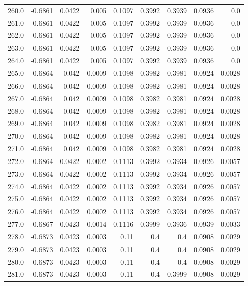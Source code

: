 \begin{longtable}{lrrrrrrrr}
260.0 & -0.6861 & 0.0422 & 0.005 & 0.1097 & 0.3992 & 0.3939 & 0.0936 & 0.0 \\
261.0 & -0.6861 & 0.0422 & 0.005 & 0.1097 & 0.3992 & 0.3939 & 0.0936 & 0.0 \\
262.0 & -0.6861 & 0.0422 & 0.005 & 0.1097 & 0.3992 & 0.3939 & 0.0936 & 0.0 \\
263.0 & -0.6861 & 0.0422 & 0.005 & 0.1097 & 0.3992 & 0.3939 & 0.0936 & 0.0 \\
264.0 & -0.6861 & 0.0422 & 0.005 & 0.1097 & 0.3992 & 0.3939 & 0.0936 & 0.0 \\
265.0 & -0.6864 & 0.042 & 0.0009 & 0.1098 & 0.3982 & 0.3981 & 0.0924 & 0.0028 \\
266.0 & -0.6864 & 0.042 & 0.0009 & 0.1098 & 0.3982 & 0.3981 & 0.0924 & 0.0028 \\
267.0 & -0.6864 & 0.042 & 0.0009 & 0.1098 & 0.3982 & 0.3981 & 0.0924 & 0.0028 \\
268.0 & -0.6864 & 0.042 & 0.0009 & 0.1098 & 0.3982 & 0.3981 & 0.0924 & 0.0028 \\
269.0 & -0.6864 & 0.042 & 0.0009 & 0.1098 & 0.3982 & 0.3981 & 0.0924 & 0.0028 \\
270.0 & -0.6864 & 0.042 & 0.0009 & 0.1098 & 0.3982 & 0.3981 & 0.0924 & 0.0028 \\
271.0 & -0.6864 & 0.042 & 0.0009 & 0.1098 & 0.3982 & 0.3981 & 0.0924 & 0.0028 \\
272.0 & -0.6864 & 0.0422 & 0.0002 & 0.1113 & 0.3992 & 0.3934 & 0.0926 & 0.0057 \\
273.0 & -0.6864 & 0.0422 & 0.0002 & 0.1113 & 0.3992 & 0.3934 & 0.0926 & 0.0057 \\
274.0 & -0.6864 & 0.0422 & 0.0002 & 0.1113 & 0.3992 & 0.3934 & 0.0926 & 0.0057 \\
275.0 & -0.6864 & 0.0422 & 0.0002 & 0.1113 & 0.3992 & 0.3934 & 0.0926 & 0.0057 \\
276.0 & -0.6864 & 0.0422 & 0.0002 & 0.1113 & 0.3992 & 0.3934 & 0.0926 & 0.0057 \\
277.0 & -0.6867 & 0.0423 & 0.0014 & 0.1116 & 0.3999 & 0.3936 & 0.0939 & 0.0033 \\
278.0 & -0.6873 & 0.0423 & 0.0003 & 0.11 & 0.4 & 0.4 & 0.0908 & 0.0029 \\
279.0 & -0.6873 & 0.0423 & 0.0003 & 0.11 & 0.4 & 0.4 & 0.0908 & 0.0029 \\
280.0 & -0.6873 & 0.0423 & 0.0003 & 0.11 & 0.4 & 0.4 & 0.0908 & 0.0029 \\
281.0 & -0.6873 & 0.0423 & 0.0003 & 0.11 & 0.4 & 0.3999 & 0.0908 & 0.0029 \\

\end{longtable}
